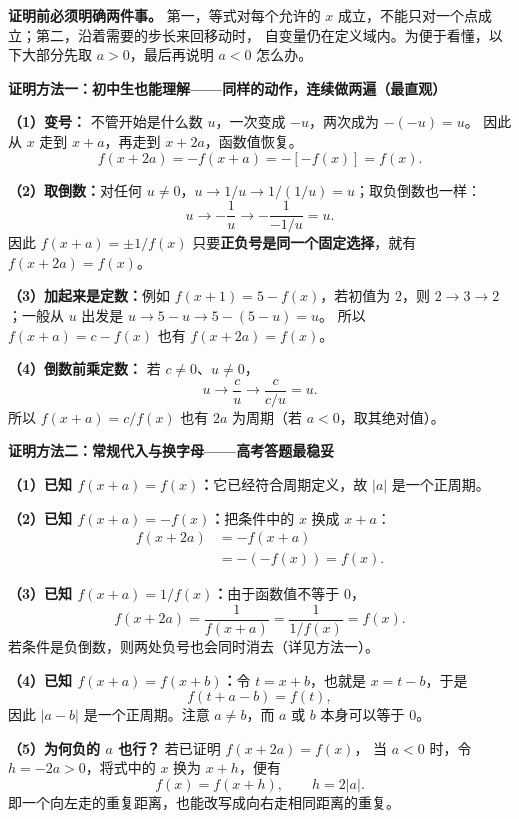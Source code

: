 \clearpage
\begin{proofbox}
\textbf{证明前必须明确两件事。}
第一，等式对每个允许的 $x$ 成立，不能只对一个点成立；第二，沿着需要的步长来回移动时，
自变量仍在定义域内。为便于看懂，以下大部分先取 $a>0$，最后再说明 $a<0$ 怎么办。

\medskip
\textbf{证明方法一：初中生也能理解——同样的动作，连续做两遍（最直观）}







\textbf{（1）变号：} 不管开始是什么数 $u$，一次变成 $-u$，两次成为 $-(-u)=u$。
因此从 $x$ 走到 $x+a$，再走到 $x+2a$，函数值恢复。
\[
 f(x+2a)=-f(x+a)=-[-f(x)]=f(x).
\]

\textbf{（2）取倒数：}对任何 $u\ne0$，$u\to1/u\to1/(1/u)=u$；取负倒数也一样：
\[
 u\longrightarrow-\frac1u\longrightarrow
 -\frac1{-1/u}=u.
\]
因此 $f(x+a)=\pm1/f(x)$ 只要\textbf{正负号是同一个固定选择}，就有 $f(x+2a)=f(x)$。

\textbf{（3）加起来是定数：}例如 $f(x+1)=5-f(x)$，若初值为 $2$，则
$2\to3\to2$；一般从 $u$ 出发是 $u\to 5-u\to5-(5-u)=u$。
所以 $f(x+a)=c-f(x)$ 也有 $f(x+2a)=f(x)$。


\textbf{（4）倒数前乘定数：} 若 $c\ne0$、$u\ne0$，
\[
 u\longrightarrow\frac{c}{u}\longrightarrow\frac{c}{c/u}=u.
\]
所以 $f(x+a)=c/f(x)$ 也有 $2a$ 为周期（若 $a<0$，取其绝对值）。

\end{proofbox}\clearpage\begin{proofbox}\textbf{证明方法二：常规代入与换字母——高考答题最稳妥}



\textbf{（1）已知 $f(x+a)=f(x)$：}它已经符合周期定义，故 $|a|$ 是一个正周期。

\textbf{（2）已知 $f(x+a)=-f(x)$：}把条件中的 $x$ 换成 $x+a$：
\[
\begin{aligned}
 f(x+2a)&=-f(x+a)\\&=-(-f(x))=f(x).
\end{aligned}
\]

\textbf{（3）已知 $f(x+a)=1/f(x)$：}由于函数值不等于 $0$，
\[
 f(x+2a)=\frac{1}{f(x+a)}=\frac{1}{1/f(x)}=f(x).
\]
若条件是负倒数，则两处负号也会同时消去（详见方法一）。

\textbf{（4）已知 $f(x+a)=f(x+b)$：}令 $t=x+b$，也就是 $x=t-b$，于是
\[
 f(t+a-b)=f(t),
\]
因此 $|a-b|$ 是一个正周期。注意 $a\ne b$，而 $a$ 或 $b$ 本身可以等于 $0$。

\textbf{（5）为何负的 $a$ 也行？} 若已证明 $f(x+2a)=f(x)$，
当 $a<0$ 时，令 $h=-2a>0$，将式中的 $x$ 换为 $x+h$，便有
\[
 f(x)=f(x+h),\qquad h=2|a|.
\]
即一个向左走的重复距离，也能改写成向右走相同距离的重复。


\end{proofbox}
